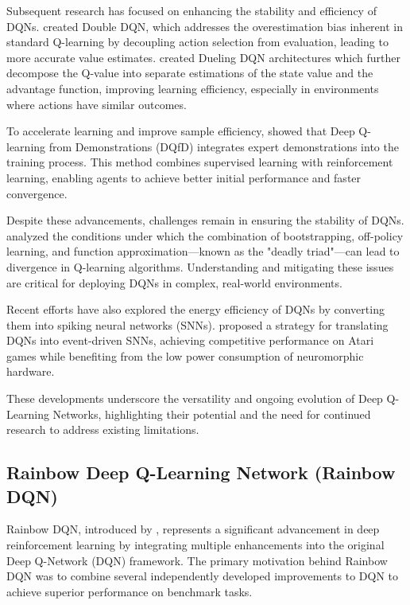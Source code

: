 \documentclass{article} %
\begin{document}
Subsequent research has focused on enhancing the stability and efficiency of DQNs. \cite{van2016deep} created Double DQN, which addresses the overestimation bias inherent in standard Q-learning by decoupling action selection from evaluation, leading to more accurate value estimates. \cite{wang2016dueling} created Dueling DQN architectures which further decompose the Q-value into separate estimations of the state value and the advantage function, improving learning efficiency, especially in environments where actions have similar outcomes.

To accelerate learning and improve sample efficiency, \cite{hester2018deep} showed that Deep Q-learning from Demonstrations (DQfD) integrates expert demonstrations into the training process. This method combines supervised learning with reinforcement learning, enabling agents to achieve better initial performance and faster convergence.

Despite these advancements, challenges remain in ensuring the stability of DQNs. \cite{achiam2019towards} analyzed the conditions under which the combination of bootstrapping, off-policy learning, and function approximation—known as the "deadly triad"—can lead to divergence in Q-learning algorithms. Understanding and mitigating these issues are critical for deploying DQNs in complex, real-world environments.

Recent efforts have also explored the energy efficiency of DQNs by converting them into spiking neural networks (SNNs). \cite{tan2020strategy} proposed a strategy for translating DQNs into event-driven SNNs, achieving competitive performance on Atari games while benefiting from the low power consumption of neuromorphic hardware.

These developments underscore the versatility and ongoing evolution of Deep Q-Learning Networks, highlighting their potential and the need for continued research to address existing limitations.

\subsection{Rainbow Deep Q-Learning Network (Rainbow DQN)}

Rainbow DQN, introduced by \cite{hessel2018rainbow}, represents a significant advancement in deep reinforcement learning by integrating multiple enhancements into the original Deep Q-Network (DQN) framework. The primary motivation behind Rainbow DQN was to combine several independently developed improvements to DQN to achieve superior performance on benchmark tasks.
\end{document}
